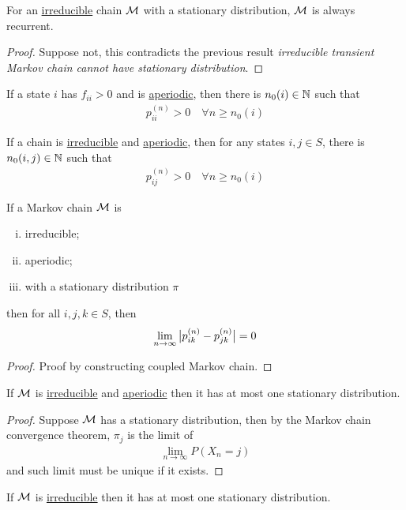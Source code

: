 \documentclass{article}
\newcommand{\upn}[0]{^{(n)}}
\begin{document}
	\begin{theorem}
		For an \ul{irreducible} chain $\mathcal{{M}}$ with a stationary distribution, $\mathcal{{M}}$ is always recurrent.
	\end{theorem}
	
	\begin{proof}
		Suppose not, this contradicts the previous result \emph{irreducible transient Markov chain cannot have stationary distribution}.
	\end{proof}
	
	\begin{proposition}
		If a state $i$ has $f_{ii} > 0$ and is \ul{aperiodic}, then there is $n_0(i) \in \mathbb{N}$ such that
		\begin{align}
			p_{ii}\upn > 0\quad \forall n \geq n_0(i)
		\end{align}
	\end{proposition}

	\begin{corollary}
		If a chain is \ul{irreducible} and \ul{aperiodic}, then for any states $i, j \in S$, there is $n_0(i, j) \in \mathbb{N}$ such that
		\begin{align}
			p_{ij}\upn > 0\quad \forall n \geq n_0(i)
		\end{align}
	\end{corollary}
	
	\begin{lemma}
		If a Markov chain $\mathcal{{M}}$ is
		\begin{enumerate}[(i)]
			\item irreducible;
			\item aperiodic;
			\item with a stationary distribution $\pi$
		\end{enumerate}
		then for all $i, j, k \in S$, then
		\begin{align}
			\lim_{n \to \infty} \abs{
				p_{ik}\upn - p_{jk}\upn
			} = 0
		\end{align}
	\end{lemma}
	
	\begin{proof}
		Proof by constructing coupled Markov chain.
	\end{proof}
	
	\begin{corollary}
		If $\mathcal{{M}}$ is \ul{irreducible} and \ul{aperiodic} then it has at most one stationary distribution.
	\end{corollary}

	\begin{proof}
		Suppose $\mathcal{{M}}$ has a stationary distribution, then by the Markov chain convergence theorem, $\pi_j$ is the limit of 
		\begin{align}
			\lim_{n \to \infty} P(X_n = j)
		\end{align}
		and such limit must be unique if it exists.
	\end{proof}

	\begin{corollary}
		If $\mathcal{{M}}$ is \ul{irreducible} then it has at most one stationary distribution.
	\end{corollary}
\end{document}

